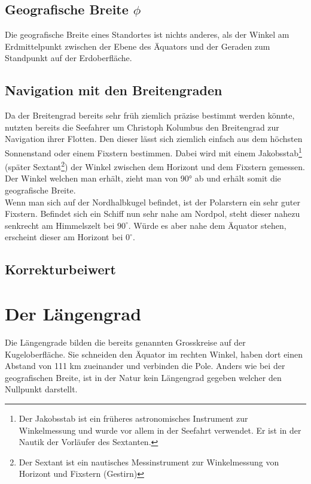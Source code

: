 \begin{refsection}

\subsection{Geografische Breite $\phi$}
\begin{definition}
Die geografische Breite eines Standortes ist nichts anderes, als der Winkel am Erdmittelpunkt zwischen der Ebene des Äquators und der Geraden zum Standpunkt auf der Erdoberfläche.
\end{definition}


\subsection{Navigation mit den Breitengraden}
Da der Breitengrad bereits sehr früh ziemlich präzise bestimmt werden könnte, nutzten bereits die Seefahrer um Christoph Kolumbus den Breitengrad zur Navigation ihrer Flotten.
Den dieser lässt sich ziemlich einfach aus dem höchsten Sonnenstand oder einem Fixstern bestimmen. Dabei wird mit einem Jakobsstab\footnote{%
Der Jakobsstab ist ein früheres astronomisches Instrument zur Winkelmessung und wurde vor allem in der Seefahrt verwendet. Er ist in der Nautik der Vorläufer des Sextanten.} (später Sextant\footnote{%
Der Sextant ist ein nautisches Messinstrument zur Winkelmessung von Horizont und Fixstern (Gestirn)}) der Winkel zwischen dem Horizont und dem Fixstern gemessen. Der Winkel welchen man erhält, zieht man von 90° ab und erhält somit die geografische Breite. \\


Wenn man sich auf der Nordhalbkugel befindet, ist der Polarstern ein sehr guter Fixstern. Befindet sich ein Schiff nun sehr nahe am Nordpol, steht dieser nahezu senkrecht am Himmelszelt bei $90^{\circ}$. Würde es aber nahe dem Äquator stehen, erscheint dieser am Horizont bei $0^{\circ}$.

\subsection{Korrekturbeiwert}

\section{Der Längengrad}
Die Längengrade bilden die bereits genannten Grosskreise auf der Kugeloberfläche.
Sie schneiden den Äquator im rechten Winkel, haben dort einen Abstand von 111 km zueinander und verbinden die Pole. Anders wie bei der geografischen Breite, ist in der Natur kein Längengrad gegeben welcher den Nullpunkt darstellt.


\end{refsection}
